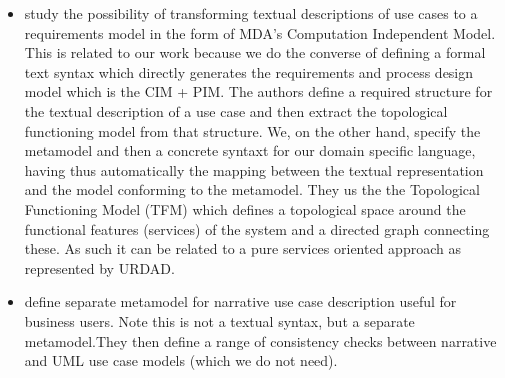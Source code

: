 \begin{itemize}
   \item \cite{osis_transforming_2010} study the possibility of transforming textual descriptions of use cases to a requirements model in the form of MDA's Computation Independent Model. This is related to our work because we do the converse of defining a formal text syntax which directly generates the requirements and process design model which is the CIM + PIM. The authors define a required structure for the textual description of a use case and then extract the topological functioning model from that structure. We, on the other hand, specify the metamodel and then a concrete syntaxt for our domain specific language, having thus automatically the mapping between the textual representation and the model conforming to the metamodel. They us the the Topological Functioning Model (TFM) which defines a topological space around the functional features (services) of the system and a directed graph connecting these. As such it can be related to a pure services oriented approach as represented by URDAD.
   \item \cite{hoffmann_towards_2009} define separate metamodel for narrative use case description useful for business users. Note this is not a textual syntax, but a separate metamodel.They then define a range of consistency checks between narrative and UML use case models (which we do not need). 

\end{itemize}
